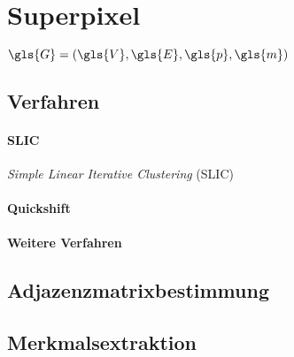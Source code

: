 \section{Superpixel}
\label{superpixel}

$\gls{G} = \left(\gls{V}, \gls{E}, \gls{p}, \gls{m}\right)$

\subsection{Verfahren}
\label{superpixel_verfahren}

\paragraph{SLIC}
\label{slic}

\cite{slic}

\emph{Simple Linear Iterative Clustering} (SLIC)

\paragraph{Quickshift}
\label{quickshift}

\cite{quickshift}

\paragraph{Weitere Verfahren}
\label{weitere_superpixel_verfahren}

\cite{felzenszwalb}

\subsection{Adjazenzmatrixbestimmung}
\label{adjazenzmatrixbestimmung}

\subsection{Merkmalsextraktion}
\label{merkmalsextraktion}

